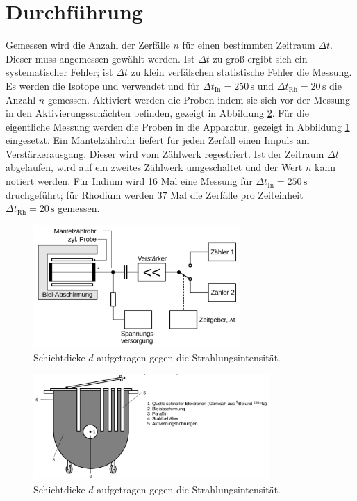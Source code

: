 \section{Durchf\"uhrung}
\label{sec:Durchfuehrung}
Gemessen wird die Anzahl der Zerfälle $n$ für einen bestimmten Zeitraum $\Delta{t}$. Dieser muss angemessen gewählt werden. Ist $\Delta{t}$ zu groß ergibt sich ein systematischer Fehler; ist $\Delta{t}$ zu klein verfälschen statistische Fehler die Messung.
Es werden die Isotope  und  verwendet und für $\Delta{t_\mathup{In}=250\,\si\second}$ und $\Delta{t_\mathup{Rh}=20\,\si\second}$ die Anzahl $n$ gemessen.
Aktiviert werden die Proben indem sie sich vor der Messung in den Aktivierungsschächten befinden, gezeigt in Abbildung \ref{fig:aktivierung}. Für die eigentliche Messung werden die Proben in die Apparatur, gezeigt in Abbildung \ref{fig:apparatur} eingesetzt. Ein Mantelzählrohr liefert für jeden Zerfall einen Impuls am Verstärkerausgang. Dieser wird vom Zählwerk regestriert. Ist der Zeitraum $\Delta{t}$ abgelaufen, wird auf ein zweites Zählwerk umgeschaltet und der Wert $n$ kann notiert werden. Für Indium wird 16 Mal eine Messung für $\Delta{t_\mathup{In}}=250\,\si\second$ druchgeführt; für Rhodium werden $37$ Mal die Zerfälle pro Zeiteinheit $\Delta{t_\mathup{Rh}}=20\,\si\second$ gemessen.
\begin{figure}[p]
	\centering
	\includegraphics[width=0.7\textwidth]{Bilder/Aktivierung.pdf}
	\caption{Schichtdicke $d$ aufgetragen gegen die Strahlungsintensität.}
	\label{fig:apparatur}
\end{figure}

\begin{figure}[p]
	\centering
	\includegraphics[width=0.8\textwidth]{Bilder/wirklicheAktivierung.pdf}
	\caption{Schichtdicke $d$ aufgetragen gegen die Strahlungsintensität.}
	\label{fig:aktivierung}
\end{figure}
\newpage